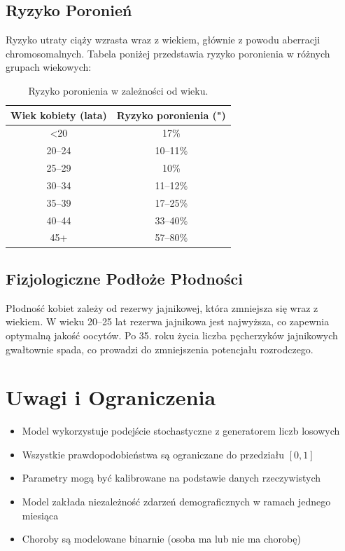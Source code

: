 \documentclass[]{article}
\begin{document}
\subsection{Ryzyko Poronień}

Ryzyko utraty ciąży wzrasta wraz z wiekiem, głównie z powodu aberracji chromosomalnych. Tabela poniżej przedstawia ryzyko poronienia w różnych grupach wiekowych:

\begin{table}[h!]
\centering
\begin{tabular}{|c|c|}
\hline
\textbf{Wiek kobiety (lata)} & \textbf{Ryzyko poronienia (")} \\
\hline
<20 & 17\% \\
20–24 & 10–11\% \\
25–29 & 10\% \\
30–34 & 11–12\% \\
35–39 & 17–25\% \\
40–44 & 33–40\% \\
45+ & 57–80\% \\
\hline
\end{tabular}
\caption{Ryzyko poronienia w zależności od wieku.}
\end{table}

\subsection{Fizjologiczne Podłoże Płodności}

Płodność kobiet zależy od rezerwy jajnikowej, która zmniejsza się wraz z wiekiem. W wieku 20–25 lat rezerwa jajnikowa jest najwyższa, co zapewnia optymalną jakość oocytów. Po 35. roku życia liczba pęcherzyków jajnikowych gwałtownie spada, co prowadzi do zmniejszenia potencjału rozrodczego.

\section{Uwagi i Ograniczenia}

\begin{itemize}
    \item Model wykorzystuje podejście stochastyczne z generatorem liczb losowych
    \item Wszystkie prawdopodobieństwa są ograniczane do przedziału $[0, 1]$
    \item Parametry mogą być kalibrowane na podstawie danych rzeczywistych
    \item Model zakłada niezależność zdarzeń demograficznych w ramach jednego miesiąca
    \item Choroby są modelowane binarnie (osoba ma lub nie ma chorobę)
\end{itemize}
\end{document}
